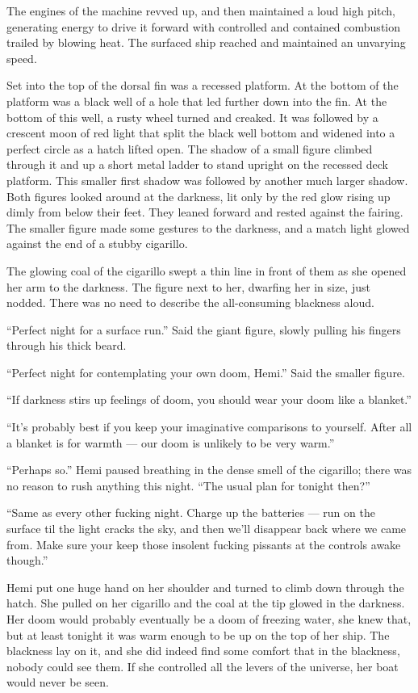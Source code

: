 \documentclass[]{article}
\begin{document}
The engines of the machine revved up, and then maintained a loud high
pitch, generating energy to drive it forward with controlled and
contained combustion trailed by blowing heat. The surfaced ship reached
and maintained an unvarying speed.

Set into the top of the dorsal fin was a recessed platform. At the
bottom of the platform was a black well of a hole that led further down
into the fin. At the bottom of this well, a rusty wheel turned and
creaked. It was followed by a crescent moon of red light that split the
black well bottom and widened into a perfect circle as a hatch lifted
open. The shadow of a small figure climbed through it and up a short
metal ladder to stand upright on the recessed deck platform. This
smaller first shadow was followed by another much larger shadow. Both
figures looked around at the darkness, lit only by the red glow rising
up dimly from below their feet. They leaned forward and rested against
the fairing. The smaller figure made some gestures to the darkness, and
a match light glowed against the end of a stubby cigarillo.

The glowing coal of the cigarillo swept a thin line in front of them as
she opened her arm to the darkness. The figure next to her, dwarfing her
in size, just nodded. There was no need to describe the all-consuming
blackness aloud.

``Perfect night for a surface run.'' Said the giant figure, slowly
pulling his fingers through his thick beard.

``Perfect night for contemplating your own doom, Hemi.'' Said the
smaller figure.

``If darkness stirs up feelings of doom, you should wear your doom like
a blanket.''

``It's probably best if you keep your imaginative comparisons to
yourself. After all a blanket is for warmth --- our doom is unlikely to
be very warm.''

``Perhaps so.'' Hemi paused breathing in the dense smell of the
cigarillo; there was no reason to rush anything this night. ``The usual
plan for tonight then?''

``Same as every other fucking night. Charge up the batteries --- run on
the surface til the light cracks the sky, and then we'll disappear back
where we came from. Make sure your keep those insolent fucking pissants
at the controls awake though.''

Hemi put one huge hand on her shoulder and turned to climb down through
the hatch. She pulled on her cigarillo and the coal at the tip glowed in
the darkness. Her doom would probably eventually be a doom of freezing
water, she knew that, but at least tonight it was warm enough to be up
on the top of her ship. The blackness lay on it, and she did indeed find
some comfort that in the blackness, nobody could see them. If she
controlled all the levers of the universe, her boat would never be seen.
\end{document}
